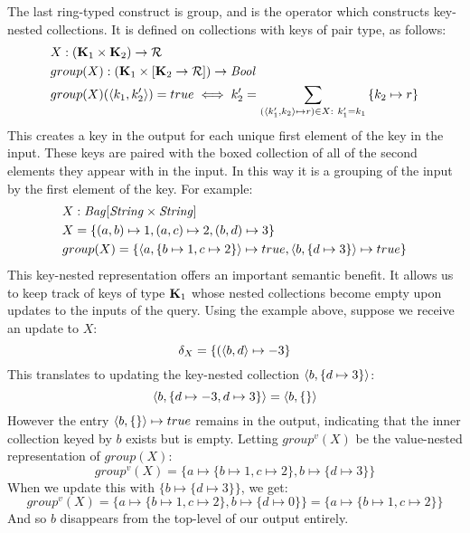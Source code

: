 {{{\vs The last ring-typed construct is group, and is the operator which constructs key-nested collections. It is defined on collections with keys of pair type, as follows:
\begin{equation*}
\begin{split}
&X: (\mathbf{K}_1 \times \mathbf{K}_2) \rightarrow \mathcal{R} \\
&group(X): (\mathbf{K}_1 \times [\mathbf{K}_2 \rightarrow \mathcal{R}]) \rightarrow \textrm{\textit{Bool}} \\
&group(X)(\langle k_1, k_2' \rangle) = true \iff k_2' = \sum_{(\langle k_1', k_2 \rangle \mapsto r) \in X : \ k_1' = k_1} {\{k_2 \mapsto r\}} 
\end{split}
\end{equation*}
This creates a key in the output for each unique first element of the key in the input. These keys are paired with the boxed collection of all of the second elements they appear with in the input. In this way it is a grouping of the input by the first element of the key. For example:
\begin{equation*}
\begin{split}
&X: \textrm{\textit{Bag}}[\textrm{\textit{String}}\times \textrm{\textit{String}}] \\
&X = \{(a,b) \mapsto 1, (a, c) \mapsto 2, (b,d) \mapsto 3\} \\
&group(X) = \{\langle a, \{b \mapsto 1, c \mapsto 2\} \rangle \mapsto true, \langle b, \{d \mapsto 3 \} \rangle \mapsto true \}
\end{split}
\end{equation*}
This key-nested representation offers an important semantic benefit. It allows us to keep track of keys of type $\mathbf{K}_1$ whose nested collections become empty upon updates to the inputs of the query. Using the example above, suppose we receive an update to $X$:
\begin{equation*}
\delta_X = \{(\langle b, d \rangle \mapsto -3\}
\end{equation*}
This translates to updating the key-nested collection $\langle b, \{d \mapsto 3\} \rangle$:
\begin{equation*}
 \langle b, \{d \mapsto -3, d \mapsto 3\} \rangle = \langle b, \{\} \rangle
 \end{equation*}
However the entry $\langle b, \{\} \rangle \mapsto true$ remains in the output, indicating that the inner collection keyed by $b$ exists but is empty.
Letting $group^v(X)$ be the value-nested representation of $group(X)$:
\begin{equation*}
group^v(X) = \{a \mapsto \{b \mapsto 1, c  \mapsto 2\}, b \mapsto \{d \mapsto 3\}\}
\end{equation*}
When we update this with $\{b \mapsto \{d \mapsto 3\}\}$, we get:
\begin{equation*}
group^v(X) = \{a \mapsto \{b \mapsto 1, c  \mapsto 2\}, b \mapsto \{d \mapsto 0\}\} = \{a \mapsto \{b \mapsto 1, c  \mapsto 2\}\}
\end{equation*}
And so $b$ disappears from the top-level of our output entirely. 

}}}
